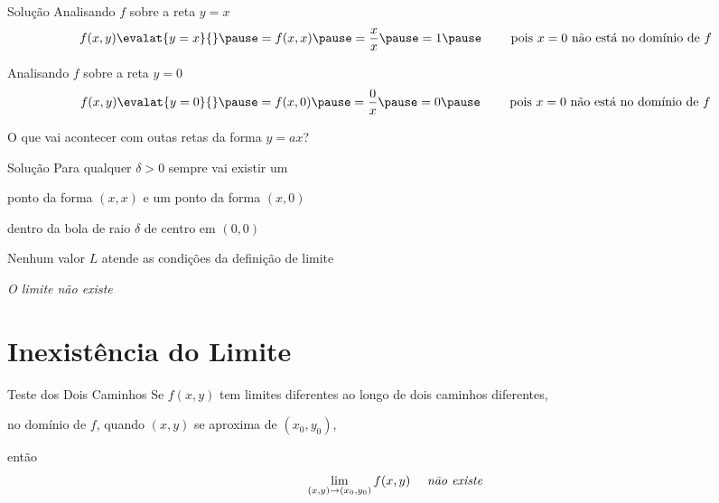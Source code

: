 \begin{resolution}{Solução}
  Analisando $f$ sobre a reta \(y=x\)
  \pause
  \[
    f(x, y) \evalat{y=x}{}
    \pause
    = f(x, x)
    \pause
    = \frac{x}{x}
    \pause
    = 1
    \pause
    \qquad\text{ pois } x=0 \text{ não está no domínio de } f
  \]

  \pause
  Analisando $f$ sobre a reta \(y=0\)
  \pause
  \[
    f(x, y) \evalat{y=0}{}
    \pause
    = f(x, 0)
    \pause
    = \frac{0}{x}
    \pause
    = 0
    \pause
    \qquad\text{ pois } x=0 \text{ não está no domínio de } f
  \]

  \pause
  O que vai acontecer com outas retas da forma \(y=ax\)?
\end{resolution}

\begin{resolution}{Solução}
  Para qualquer $\delta>0$
  \pause
  sempre vai existir um

  ponto da forma \((x, x)\) e um ponto da forma \((x, 0)\)

  \pause
  dentro da bola de raio $\delta$ de centro em \((0, 0)\)

  \pause
  Nenhum valor $L$ atende as condições da definição de limite

  \pause
  \vspace{\baselineskip}
  \emph{O limite não existe}
\end{resolution}

\section{Inexistência do Limite}

\begin{frame}{Teste dos Dois Caminhos}
  Se \(f(x, y)\) tem limites diferentes ao longo de dois caminhos
  diferentes,

  no domínio de $f$,
  \pause
  quando $(x, y)$ se aproxima de $(x_0, y_0)$,

  \pause
  então
  \[
    \lim_{(x, y)\to(x_0, y_0)} f(x, y) \quad \text{ \emph{não existe}}
  \]
\end{frame}

